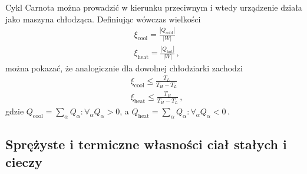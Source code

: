 \documentclass[../main.tex]{subfiles}
\begin{document}
Cykl Carnota można prowadzić w kierunku przeciwnym i wtedy urządzenie działa jako maszyna chłodząca. Definiując wówczas wielkości
\begin{equation*}
\begin{split}
    &\xi_\text{cool}=\frac{|Q_\text{cold}|}{|W|}\\
    &\xi_\text{heat}=\frac{|Q_\text{hot}|}{|W|}\,,
\end{split}
\end{equation*}
można pokazać, że analogicznie dla dowolnej chłodziarki zachodzi
\begin{equation*}
    \begin{split}
        &\xi_\text{cool}\leq \frac{T_L}{T_H-T_L}\\
        &\xi_\text{heat}\leq\frac{T_H}{T_H-T_L}\,,
    \end{split}
\end{equation*}
gdzie \(Q_\text{cool}=\sum_\alpha Q_\alpha : \forall_\alpha Q_\alpha >0\), a \(Q_\text{heat}=\sum_\alpha Q_\alpha : \forall_\alpha Q_\alpha <0\)\,.

\subsection{Sprężyste i termiczne własności ciał stałych i cieczy}
\end{document}
